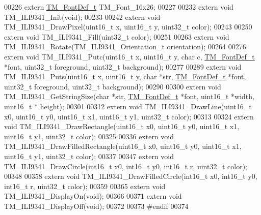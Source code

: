 \begin{DoxyCode}
00226 \textcolor{keyword}{extern} \hyperlink{struct_t_m___font_def__t}{TM\_FontDef\_t} TM\_Font\_16x26;
00227 
00232 \textcolor{keyword}{extern} \textcolor{keywordtype}{void} TM\_ILI9341\_Init(\textcolor{keywordtype}{void});
00233 
00242 \textcolor{keyword}{extern} \textcolor{keywordtype}{void} TM\_ILI9341\_DrawPixel(uint16\_t x, uint16\_t y, uint32\_t color);
00243 
00250 \textcolor{keyword}{extern} \textcolor{keywordtype}{void} TM\_ILI9341\_Fill(uint32\_t color);
00251 
00263 \textcolor{keyword}{extern} \textcolor{keywordtype}{void} TM\_ILI9341\_Rotate(TM\_ILI9341\_Orientation\_t orientation);
00264 
00276 \textcolor{keyword}{extern} \textcolor{keywordtype}{void} TM\_ILI9341\_Putc(uint16\_t x, uint16\_t y, \textcolor{keywordtype}{char} c, \hyperlink{struct_t_m___font_def__t}{TM\_FontDef\_t} *font, uint32\_t 
      foreground, uint32\_t background);
00277 
00289 \textcolor{keyword}{extern} \textcolor{keywordtype}{void} TM\_ILI9341\_Puts(uint16\_t x, uint16\_t y, \textcolor{keywordtype}{char} *str, \hyperlink{struct_t_m___font_def__t}{TM\_FontDef\_t} *font, uint32\_t 
      foreground, uint32\_t background);
00290 
00300 \textcolor{keyword}{extern} \textcolor{keywordtype}{void} TM\_ILI9341\_GetStringSize(\textcolor{keywordtype}{char} *str, \hyperlink{struct_t_m___font_def__t}{TM\_FontDef\_t} *font, uint16\_t *width, uint16\_t *
      height);
00301 
00312 \textcolor{keyword}{extern} \textcolor{keywordtype}{void} TM\_ILI9341\_DrawLine(uint16\_t x0, uint16\_t y0, uint16\_t x1, uint16\_t y1, uint32\_t color);
00313 
00324 \textcolor{keyword}{extern} \textcolor{keywordtype}{void} TM\_ILI9341\_DrawRectangle(uint16\_t x0, uint16\_t y0, uint16\_t x1, uint16\_t y1, uint32\_t color);
00325 
00336 \textcolor{keyword}{extern} \textcolor{keywordtype}{void} TM\_ILI9341\_DrawFilledRectangle(uint16\_t x0, uint16\_t y0, uint16\_t x1, uint16\_t y1, uint32\_t 
      color);
00337 
00347 \textcolor{keyword}{extern} \textcolor{keywordtype}{void} TM\_ILI9341\_DrawCircle(int16\_t x0, int16\_t y0, int16\_t r, uint32\_t color);
00348 
00358 \textcolor{keyword}{extern} \textcolor{keywordtype}{void} TM\_ILI9341\_DrawFilledCircle(int16\_t x0, int16\_t y0, int16\_t r, uint32\_t color);
00359 
00365 \textcolor{keyword}{extern} \textcolor{keywordtype}{void} TM\_ILI9341\_DisplayOn(\textcolor{keywordtype}{void});
00366 
00371 \textcolor{keyword}{extern} \textcolor{keywordtype}{void} TM\_ILI9341\_DisplayOff(\textcolor{keywordtype}{void});
00372 
00373 \textcolor{preprocessor}{#endif}
00374 
\end{DoxyCode}
